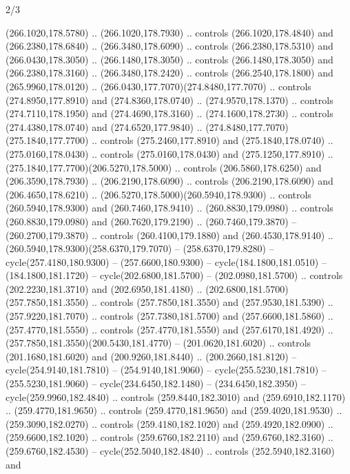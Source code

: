 \begin{flagdescription}{2/3}
\begin{scope}[xshift=0.5\flaglength,yshift=0.5\flagwidth,scale=\flagwidth/259.2]
\begin{scope}[y=0.8pt, x=0.8pt, yscale=-1,shift={(-243,-162)}]
      (266.1020,178.5780) .. (266.1020,178.7930) .. controls (266.1020,178.4840) and
      (266.2380,178.6840) .. (266.3480,178.6090) .. controls (266.2380,178.5310) and
      (266.0430,178.3050) .. (266.1480,178.3050) .. controls (266.1480,178.3050) and
      (266.2380,178.3160) .. (266.3480,178.2420) .. controls (266.2540,178.1800) and
      (265.9960,178.0120) .. (266.0430,177.7070)(274.8480,177.7070) .. controls
      (274.8950,177.8910) and (274.8360,178.0740) .. (274.9570,178.1370) .. controls
      (274.7110,178.1950) and (274.4690,178.3160) .. (274.1600,178.2730) .. controls
      (274.4380,178.0740) and (274.6520,177.9840) ..
      (274.8480,177.7070)(275.1840,177.7700) .. controls (275.2460,177.8910) and
      (275.1840,178.0740) .. (275.0160,178.0430) .. controls (275.0160,178.0430) and
      (275.1250,177.8910) .. (275.1840,177.7700)(206.5270,178.5000) .. controls
      (206.5860,178.6250) and (206.3590,178.7930) .. (206.2190,178.6090) .. controls
      (206.2190,178.6090) and (206.4650,178.6210) ..
      (206.5270,178.5000)(260.5940,178.9300) .. controls (260.5940,178.9300) and
      (260.7460,178.9410) .. (260.8830,179.0980) .. controls (260.8830,179.0980) and
      (260.7620,179.2190) .. (260.7460,179.3870) -- (260.2700,179.3870) .. controls
      (260.4100,179.1880) and (260.4530,178.9140) ..
      (260.5940,178.9300)(258.6370,179.7070) -- (258.6370,179.8280) --
      cycle(257.4180,180.9300) -- (257.6600,180.9300) -- cycle(184.1800,181.0510) --
      (184.1800,181.1720) -- cycle(202.6800,181.5700) -- (202.0980,181.5700) ..
      controls (202.2230,181.3710) and (202.6950,181.4180) ..
      (202.6800,181.5700)(257.7850,181.3550) .. controls (257.7850,181.3550) and
      (257.9530,181.5390) .. (257.9220,181.7070) .. controls (257.7380,181.5700) and
      (257.6600,181.5860) .. (257.4770,181.5550) .. controls (257.4770,181.5550) and
      (257.6170,181.4920) .. (257.7850,181.3550)(200.5430,181.4770) --
      (201.0620,181.6020) .. controls (201.1680,181.6020) and (200.9260,181.8440) ..
      (200.2660,181.8120) -- cycle(254.9140,181.7810) -- (254.9140,181.9060) --
      cycle(255.5230,181.7810) -- (255.5230,181.9060) -- cycle(234.6450,182.1480) --
      (234.6450,182.3950) -- cycle(259.9960,182.4840) .. controls
      (259.8440,182.3010) and (259.6910,182.1170) .. (259.4770,181.9650) .. controls
      (259.4770,181.9650) and (259.4020,181.9530) .. (259.3090,182.0270) .. controls
      (259.4180,182.1020) and (259.4920,182.0900) .. (259.6600,182.1020) .. controls
      (259.6760,182.2110) and (259.6760,182.3160) .. (259.6760,182.4530) --
      cycle(252.5040,182.4840) .. controls (252.5940,182.3160) and

\end{scope}
\end{scope}
\end{flagdescription}
